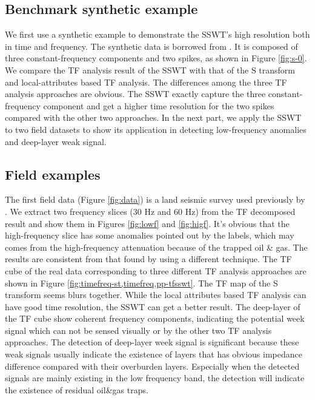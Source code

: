 \subsection{Benchmark synthetic example}
We first use a synthetic example to demonstrate the SSWT's high resolution both in time and frequency. The synthetic data is borrowed from \cite{guochang20112}. It is composed of three constant-frequency components and two spikes, as shown in Figure \ref{fig:s-0}. We compare the TF analysis result of the SSWT with that of the S transform and local-attributes based TF analysis.  %
The differences among the three TF analysis approaches are obvious. The SSWT exactly capture the three constant-frequency component and get a higher time resolution for the two spikes compared with the other two approaches. In the next part, we apply the SSWT to two field datasets to show its application in detecting low-frequency anomalies and deep-layer weak signal.

\subsection{Field examples}
The first field data (Figure \ref{fig:data}) is a land seismic survey used previously by \cite[]{fomel20132}. We extract two frequency slices (30 Hz and 60 Hz) from the TF decomposed result and show them in Figures \ref{fig:lowf} and \ref{fig:higf}. It's obvious that the high-frequency slice has some anomalies pointed out by the labels, which may comes from the high-frequency attenuation because of the trapped oil \& gas. The results are consistent from that found by \cite{fomel20132} using a different technique. The TF cube of the real data corresponding to three different TF analysis approaches are shown in Figure \ref{fig:timefreq-st,timefreq,pp-tfsswt}. The TF map of the S transform seems blurs together. While the local attributes based TF analysis can have good time resolution, the SSWT can get a better result.
The deep-layer of the TF cube show coherent frequency components, indicating the %
potential week signal which can not be sensed visually or by the other two TF analysis approaches. The detection of deep-layer week signal is significant because these weak signals usually indicate the existence of layers that has obvious impedance difference compared with their overburden layers. Especially when the detected signals are mainly existing in the low frequency band, the detection will indicate the existence of residual oil\&gas traps.


